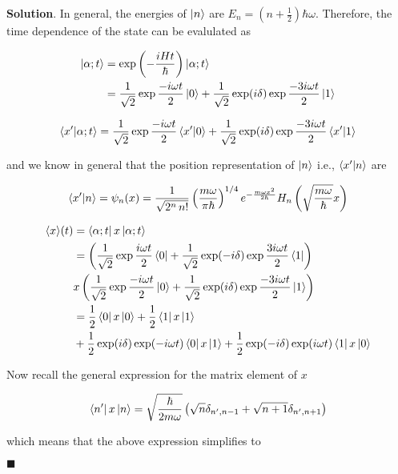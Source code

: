 \documentclass[12pt]{article}
\theoremstyle{definition}
\newenvironment{s}{%
        \begin{trivlist} \item \textbf{Solution}. }{%
            \hspace*{\fill} $\blacksquare$\end{trivlist}}%
\begin{document}
{\begin{s}
In general, the energies of $\ket{n}$ are $E_{n} = \left(n+\frac{1}{2}\right)\hbar\omega$. Therefore, the time dependence of the state can be evalulated as

\begin{align*}
\ket{\alpha;t} &= \exp\left(-\frac{iHt}{\hbar}\right)\ket{\alpha;t}\\
&= \frac{1}{\sqrt{2}}\exp\frac{-i\omega t}{2}\ket{0} + \frac{1}{\sqrt{2}}\exp(i\delta)\exp\frac{-3i\omega t}{2}\ket{1}
\end{align*}

\begin{align*}
\bra{x'}\ket{\alpha;t} = \frac{1}{\sqrt{2}}\exp\frac{-i\omega t}{2}\bra{x'}\ket{0} + \frac{1}{\sqrt{2}}\exp(i\delta)\exp\frac{-3i\omega t}{2}\bra{x'}\ket{1}
\end{align*}

and we know in general that the position representation of $\ket{n}$ i.e., $\bra{x'}\ket{n}$ are

\begin{align*}
\bra{x'}\ket{n} = \psi _{n}(x)={\frac {1}{\sqrt {2^{n}\,n!}}}\left({\frac {m\omega }{\pi \hbar }}\right)^{1/4}e^{-{\frac {m\omega x^{2}}{2\hbar }}}H_{n}\left({\sqrt {\frac {m\omega }{\hbar }}}x\right)
\end{align*}


\begin{align*}
\langle x\rangle(t) &= \bra{\alpha;t}x\ket{\alpha;t}\\
&= \left(\frac{1}{\sqrt{2}}\exp\frac{i\omega t}{2}\bra{0} + \frac{1}{\sqrt{2}}\exp(-i\delta)\exp\frac{3i\omega t}{2}\bra{1}\right) \\
&x \left(\frac{1}{\sqrt{2}}\exp\frac{-i\omega t}{2}\ket{0} + \frac{1}{\sqrt{2}}\exp(i\delta)\exp\frac{-3i\omega t}{2}\ket{1}\right)\\
&= \frac{1}{2}\bra{0}x\ket{0} + \frac{1}{2}\bra{1}x\ket{1} \\
&+ \frac{1}{2}\exp(i\delta)\exp(-i\omega t)\bra{0}x\ket{1} + \frac{1}{2}\exp(-i\delta)\exp(i\omega t)\bra{1}x\ket{0}
\end{align*}

Now recall the general expression for the matrix element of $x$

\begin{align*}
\bra{n'}x\ket{n} = \sqrt{\frac{\hbar}{2m\omega}}\left(\sqrt{n}\delta_{n',n-1} +\sqrt{n+1}\delta_{n',n+1}\right)
\end{align*}

which means that the above expression simplifies to 


\end{s}}
\end{document}
